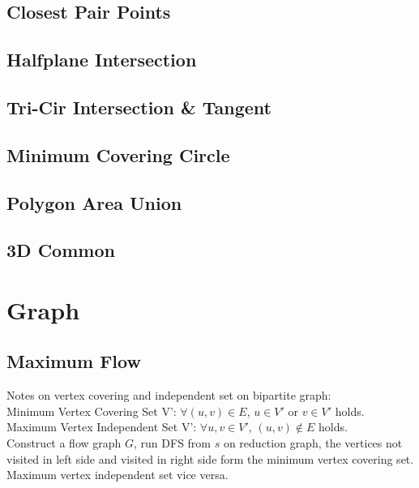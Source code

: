 \documentclass[10pt]{article}
\begin{document}
{\subsection{Closest Pair Points}

\subsection{Halfplane Intersection}


\subsection{Tri-Cir Intersection \& Tangent}



% 
\subsection{Minimum Covering Circle}

\subsection{Polygon Area Union}

\subsection{3D Common}

\section{Graph}
\subsection{Maximum Flow}

Notes on vertex covering and independent set on bipartite graph:\\
Minimum Vertex Covering Set V': $\forall (u,v) \in E$, $u \in V'$ or $v \in V'$ holds. \\
Maximum Vertex Independent Set V': $\forall u,v \in V'$, $(u,v) \notin E$ holds.\\
Construct a flow graph $G$, run DFS from $s$ on reduction graph, the vertices not visited in left side and visited in right side form the minimum vertex covering set.\\
Maximum vertex independent set vice versa.\\
}
\end{document}
